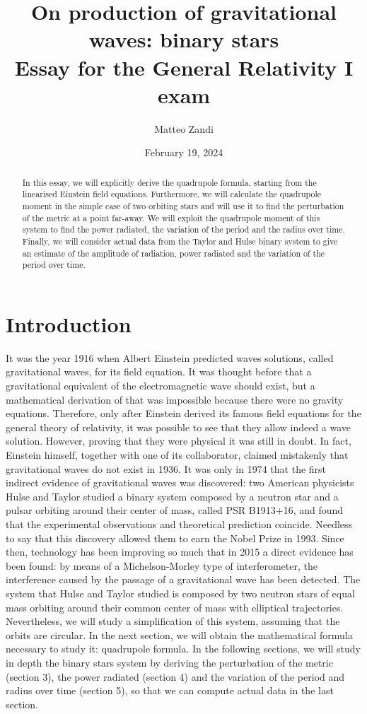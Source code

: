 \documentclass[a4paper]{article}
\title{On production of gravitational waves: binary stars\\\linespread{1.5}
\small Essay for the General Relativity I exam}
\author{Matteo Zandi}
\date{February 19, 2024}
\begin{document}
\maketitle

\begin{abstract}
    In this essay, we will explicitly derive the quadrupole formula, starting from the linearised Einstein field equations. Furthermore, we will calculate the quadrupole moment in the simple case of two orbiting stars and will use it to find the perturbation of the metric at a point far-away. We will exploit the quadrupole moment of this system to find the power radiated, the variation of the period and the radius over time. Finally, we will consider actual data from the Taylor and Hulse binary system to give an estimate of the amplitude of radiation, power radiated and the variation of the period over time.
\end{abstract}

\section{Introduction}

    It was the year 1916 when Albert Einstein predicted waves solutions, called gravitational waves, for its field equation. It was thought before that a gravitational equivalent of the electromagnetic wave should exist, but a mathematical derivation of that was impossible because there were no gravity equations. Therefore, only after Einstein derived its famous field equations for the general theory of relativity, it was possible to see that they allow indeed a wave solution. However, proving that they were physical it was still in doubt. In fact, Einstein himself, together with one of its collaborator, claimed mistakenly that gravitational waves do not exist in 1936. It was only in 1974 that the first indirect evidence of gravitational waves was discovered: two American physicists Hulse and Taylor studied a binary system composed by a neutron star and a pulsar orbiting around their center of mass, called PSR B1913+16, and found that the experimental observations and theoretical prediction coincide. Needless to say that this discovery allowed them to earn the Nobel Prize in 1993. Since then, technology has been improving so much that in 2015 a direct evidence has been found: by means of a Michelson-Morley type of interferometer, the interference caused by the passage of a gravitational wave has been detected. The system that Hulse and Taylor studied is composed by two neutron stars of equal mass orbiting around their common center of mass with elliptical trajectories. Nevertheless, we will study a simplification of this system, assuming that the orbits are circular. In the next section, we will obtain the mathematical formula necessary to study it: quadrupole formula. In the following sections, we will study in depth the binary stars system by deriving the perturbation of the metric (section 3), the power radiated (section 4) and the variation of the period and radius over time (section 5), so that we can compute actual data in the last section.
\end{document}
